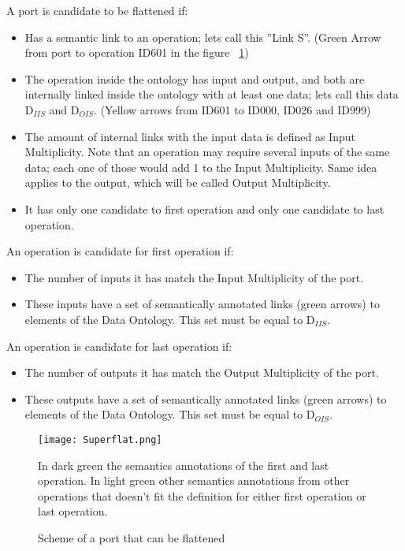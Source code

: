 \documentclass[a4paper,10pt]{article}
\begin{document}
    A port is candidate to be flattened if: 
   \begin{itemize}
      \item Has a semantic link to an operation; lets call this ''Link S''. (Green Arrow from port to operation ID601 in the figure ~\ref{fig:superflat})
      \item The operation inside the ontology has input and output, and both are internally linked inside the ontology with at least one data; lets call this data D$_{IIS}$ and D$_{OIS}$. (Yellow arrows from ID601 to ID000, ID026 and ID999)
      \item The amount of internal links with the input data is defined as Input Multiplicity. Note that an operation may require several inputs of the same data; each one of those would add 1 to the Input Multiplicity. Same idea applies to the output, which will be called Output Multiplicity.
      \item It has only one candidate to first operation and only one candidate to last operation.
  \end{itemize}

  An operation is candidate for first operation if:
  \begin{itemize}
      \item The number of inputs it has match the Input Multiplicity of the port.
      \item These inputs have a set of semantically annotated links (green arrows) to elements of the Data Ontology. This set must be equal to D$_{IIS}$.
  \end{itemize}

  An operation is candidate for last operation if:
   \begin{itemize}
      \item The number of outputs it has match the Output Multiplicity of the port.
      \item These outputs have a set of semantically annotated links (green arrows) to elements of the Data Ontology. This set must be equal to D$_{OIS}$.
  \end{itemize}

  \begin{figure}[H]
  {\centering
  \texttt{[image: Superflat.png]}
  \caption{Scheme of a port that can be flattened} \label{fig:superflat}}
  \medskip
  \small
  In dark green the semantics annotations of the first and last operation. In light green other semantics annotations from other operations that doesn't fit the definition for either first operation or last operation.
  \end{figure}
\end{document}
